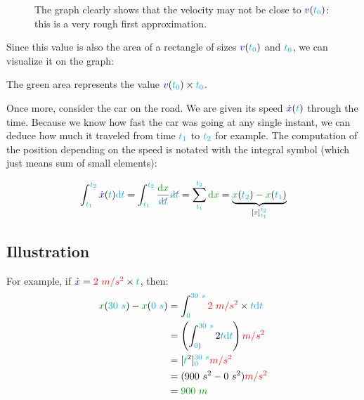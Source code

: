 \begin{figure}[H]
\centering
{}
\caption{
	The graph clearly shows that the velocity may not be close
	to $\textcolor{blue}{v}(\textcolor{cyan}{t_0})$: this is a very rough first
	approximation.
}
\end{figure}

Since this value is also the area of a rectangle of sizes
$\textcolor{blue}{v}(\textcolor{cyan}{t_0})$ and $\textcolor{cyan}{t_0}$, we can visualize it on
the graph:

The green area represents the value $\textcolor{blue}{v}(\textcolor{cyan}{t_0}) \times
\textcolor{cyan}{t_0}$.

Once more, consider the car on the road. We are given its speed
$\textcolor{blue}{\dot x}(\textcolor{cyan}{t})$ through the time. Because we know how fast the
car was going at any single instant, we can deduce how much it traveled
from time $\textcolor{cyan}{t_1}$ to $\textcolor{cyan}{t_2}$ for example. The computation of
the position depending on the speed is notated with the integral symbol
(which just means sum of small elements):

\[
\int_{\delay{t_1}}^{\delay{t_2}} \speed{\dot x}(\delay{t}) \delay{\dt}
= \int_{\delay{t_1}}^{\delay{t_2}} \frac {\dist{\d x}} {\strike[red]{\delay{\dt}}} \strike[red]{\delay{\dt}}
= \sum_{\delay{t_1}}^{\delay{t_2}} \dist{\d x}
= \underbrace{
	\dist{x}(\delay{t_2}) - \dist{x}(\delay{t_1})
}_{[\dist{x}]_{\delay{t_1}}^{\delay{t_2}}}
\]


\subsection{Illustration}

For example, if $\textcolor{blue}{\dot x} = \textcolor{red}{2~m/s^2} \times \textcolor{cyan}{t}$, then:
\begin{align*}
\dist{x}(\delay{30~s}) - \dist{x}(\delay{0~s})
&= \int_{\delay{0}}^{\delay{30~s}} \accel{2~m/s^2} \times \delay{t} \delay{\dt} \\
&= \left(\int_{\delay{0})}^{\delay{30~s}} 2 \delay{t} \delay{\dt}\right) \accel{m/s^2} \\
&= [\delay{t}^2]_{\delay{0}}^{\delay{30~s}} \accel{m/s^2} \\
&= (900~s^2 - 0~s^2) \accel{m/s^2} \\
&= \dist{900~m}
\end{align*}

